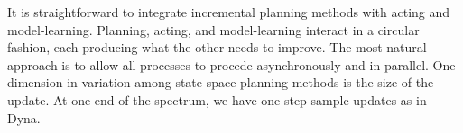 \documentclass[12pt]{article}
\begin{document}
It is straightforward to integrate incremental planning methods with acting and model-learning. Planning, acting, and model-learning interact in a circular fashion, each producing what the other needs to improve. The most natural approach is to allow all processes to procede asynchronously and in parallel.
One dimension in variation among state-space planning methods is the size of the update. At one end of the spectrum, we have one-step sample updates as in Dyna.
\end{document}
